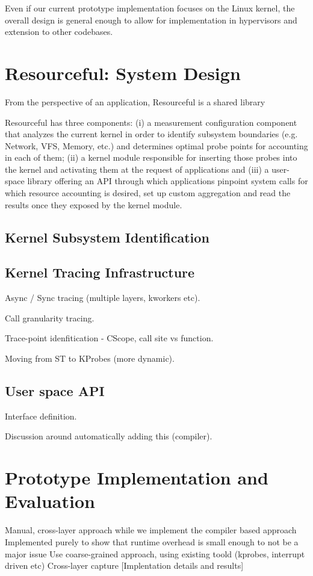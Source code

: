 \documentclass[letterpaper,twocolumn,10pt]{article}
\newcommand{\pname}{Resourceful}
\begin{document}
Even if our current prototype implementation focuses on the Linux kernel, the overall design is general enough to allow for implementation in hypervisors and extension to other codebases.

\section{Resourceful: System Design}
From the perspective of an application, \pname{} is a shared library 

\pname{ } has three components: (i) a measurement configuration component that analyzes the current kernel in order to identify subsystem boundaries (e.g. Network, VFS, Memory, etc.) and determines optimal probe points for accounting in each of them; (ii) a kernel module responsible for inserting those probes into the kernel and activating them at the request of applications and (iii) a user-space library offering an API through which applications pinpoint system calls for which resource accounting is desired, set up custom aggregation and read the results once they exposed by the kernel module. 
\subsection{Kernel Subsystem Identification}
\subsection{Kernel Tracing Infrastructure}
Async / Sync tracing (multiple layers, kworkers etc).

Call granularity tracing.

Trace-point idenfitication - CScope, call site vs function.

Moving from ST to KProbes (more dynamic).

\subsection{User space API}
Interface definition.

Discussion around automatically adding this (compiler).	

\section{Prototype Implementation and Evaluation}
Manual, cross-layer approach while we implement the compiler based approach
Implemented purely to show that runtime overhead is small enough to not be a major issue
Use coarse-grained approach, using existing toold (kprobes, interrupt driven etc)
Cross-layer capture
[Implentation details and results]
\end{document}
